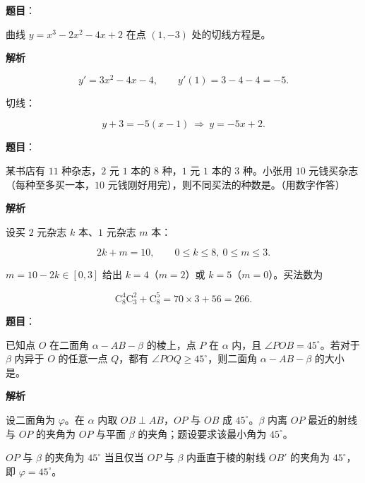 \begin{answer}

\textbf{题目}：

曲线 $y=x^3-2x^2-4x+2$ 在点 $(1,-3)$ 处的切线方程是\gkblank{}。

\textbf{解析}

\nopagebreak[4]
\[y'=3x^2-4x-4,\qquad y'(1)=3-4-4=-5.\]

切线：

\nopagebreak[4]
\[y+3=-5(x-1)\ \Rightarrow\ y=-5x+2.\]


\end{answer}
\begin{answer}

\textbf{题目}：

某书店有 $11$ 种杂志，$2$ 元 $1$ 本的 $8$ 种，$1$ 元 $1$ 本的 $3$ 种。小张用 $10$ 元钱买杂志（每种至多买一本，$10$ 元钱刚好用完），则不同买法的种数是\gkblank{}。（用数字作答）

\textbf{解析}

设买 $2$ 元杂志 $k$ 本、$1$ 元杂志 $m$ 本：

\nopagebreak[4]
\[2k+m=10,\qquad 0\leqslant k\leqslant8,\ 0\leqslant m\leqslant3.\]

$m=10-2k\in[0,3]$ 给出 $k=4$（$m=2$）或 $k=5$（$m=0$）。买法数为

\nopagebreak[4]
\[\mathrm C_8^4\mathrm C_3^2+\mathrm C_8^5=70\times3+56=266.\]


\end{answer}
\begin{answer}

\textbf{题目}：

已知点 $O$ 在二面角 $\alpha-AB-\beta$ 的棱上，点 $P$ 在 $\alpha$ 内，且 $\angle POB=45^\circ$。若对于 $\beta$ 内异于 $O$ 的任意一点 $Q$，都有 $\angle POQ\geqslant45^\circ$，则二面角 $\alpha-AB-\beta$ 的大小是\gkblank{}。

\textbf{解析}

设二面角为 $\varphi$。在 $\alpha$ 内取 $OB\perp AB$，$OP$ 与 $OB$ 成 $45^\circ$。$\beta$ 内离 $OP$ 最近的射线与 $OP$ 的夹角为 $OP$ 与平面 $\beta$ 的夹角；题设要求该最小角为 $45^\circ$。

$OP$ 与 $\beta$ 的夹角为 $45^\circ$ 当且仅当 $OP$ 与 $\beta$ 内垂直于棱的射线 $OB'$ 的夹角为 $45^\circ$，即 $\varphi=45^\circ$。


\end{answer}
